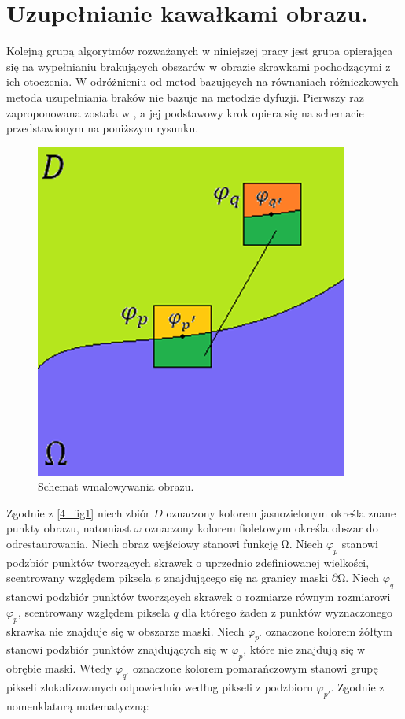 \documentclass[12pt, twoside, openany]{report}
\theoremstyle{definition}
\begin{document}
\chapter{Uzupełnianie kawałkami obrazu.}
Kolejną grupą algorytmów rozważanych w niniejszej pracy jest grupa opierająca się na wypełnianiu brakujących obszarów w obrazie skrawkami pochodzącymi z ich otoczenia. W odróżnieniu od metod bazujących na równaniach różniczkowych metoda uzupełniania braków nie bazuje na metodzie dyfuzji. Pierwszy raz zaproponowana została w \cite{efros1999texture}, a jej podstawowy krok opiera się na schemacie przedstawionym na poniższym rysunku.
\begin{figure}[!h]
	\centering
	\includegraphics[scale=0.5]{rysunki/4_fig1}
	\caption{Schemat wmalowywania obrazu.}
	\label{4_fig1}
\end{figure}
Zgodnie z \autoref{4_fig1} niech zbiór $D$ oznaczony kolorem jasnozielonym określa znane punkty obrazu, natomiast $\omega $ oznaczony kolorem fioletowym określa obszar do odrestaurowania. Niech obraz wejściowy stanowi funkcję $\mathrm{\Omega }$. Niech ${\varphi}_p$ stanowi podzbiór punktów tworzących skrawek o uprzednio zdefiniowanej wielkości, scentrowany względem piksela $p$ znajdującego się na granicy maski $\partial \mathrm{\Omega }$. Niech ${\varphi}_q$ stanowi podzbiór punktów tworzących skrawek o rozmiarze równym rozmiarowi ${\varphi}_p$, scentrowany względem piksela $q$ dla którego żaden z punktów wyznaczonego skrawka nie znajduje się w obszarze maski. Niech ${\varphi}_{p'}$ oznaczone kolorem żółtym stanowi podzbiór punktów znajdujących się w ${\varphi}_p$, które nie znajdują się w obrębie maski. Wtedy ${\varphi}_{q'}$ oznaczone kolorem pomarańczowym stanowi grupę pikseli zlokalizowanych odpowiednio według pikseli z podzbioru ${\varphi}_{p'}$. Zgodnie z nomenklaturą matematyczną:
\end{document}
